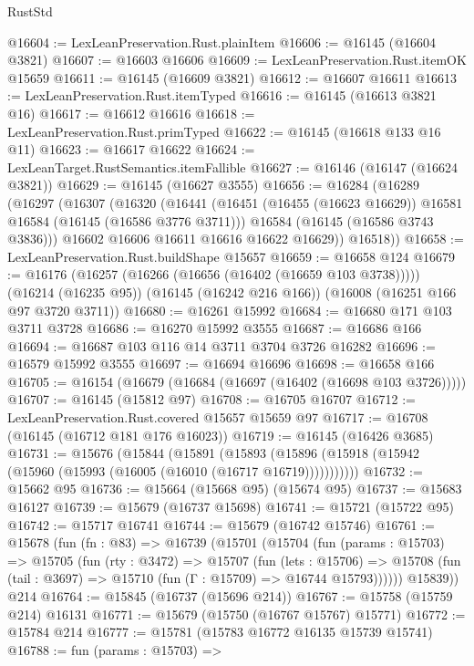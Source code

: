 \begin{lexlean}{RustStd}
\begin{coremodule}
@16604 := LexLeanPreservation.Rust.plainItem
@16606 := @16145 (@16604 @3821)
@16607 := @16603 @16606
@16609 := LexLeanPreservation.Rust.itemOK @15659
@16611 := @16145 (@16609 @3821)
@16612 := @16607 @16611
@16613 := LexLeanPreservation.Rust.itemTyped
@16616 := @16145 (@16613 @3821 @16)
@16617 := @16612 @16616
@16618 := LexLeanPreservation.Rust.primTyped
@16622 := @16145 (@16618 @133 @16 @11)
@16623 := @16617 @16622
@16624 := LexLeanTarget.RustSemantics.itemFallible
@16627 := @16146 (@16147 (@16624 @3821))
@16629 := @16145 (@16627 @3555)
@16656 := @16284
    (@16289
      (@16297
        (@16307
          (@16320
            (@16441
              (@16451 (@16455 (@16623 @16629)) @16581 @16584 (@16145 (@16586 @3776 @3711)))
              @16584
              (@16145 (@16586 @3743 @3836)))
            @16602
            @16606
            @16611
            @16616
            @16622
            @16629))
        @16518))
@16658 := LexLeanPreservation.Rust.buildShape @15657
@16659 := @16658 @124
@16679 := @16176
    (@16257 (@16266 (@16656 (@16402 (@16659 @103 @3738)))))
    (@16214 (@16235 @95))
    (@16145 (@16242 @216 @166))
    (@16008 (@16251 @166 @97 @3720 @3711))
@16680 := @16261 @15992
@16684 := @16680 @171 @103 @3711 @3728
@16686 := @16270 @15992 @3555
@16687 := @16686 @166
@16694 := @16687 @103 @116 @14 @3711 @3704 @3726 @16282
@16696 := @16579 @15992 @3555
@16697 := @16694 @16696
@16698 := @16658 @166
@16705 := @16154 (@16679 (@16684 (@16697 (@16402 (@16698 @103 @3726)))))
@16707 := @16145 (@15812 @97)
@16708 := @16705 @16707
@16712 := LexLeanPreservation.Rust.covered @15657 @15659 @97
@16717 := @16708 (@16145 (@16712 @181 @176 @16023))
@16719 := @16145 (@16426 @3685)
@16731 := @15676
    (@15844
      (@15891
        (@15893 (@15896 (@15918 (@15942 (@15960 (@15993 (@16005 (@16010 (@16717 @16719)))))))))))
@16732 := @15662 @95
@16736 := @15664 (@15668 @95) (@15674 @95)
@16737 := @15683 @16127
@16739 := @15679 (@16737 @15698)
@16741 := @15721 (@15722 @95)
@16742 := @15717 @16741
@16744 := @15679 (@16742 @15746)
@16761 := @15678
    (fun (fn : @83) =>
    @16739
      (@15701
        (@15704
          (fun (params : @15703) =>
          @15705
            (fun (rty : @3472) =>
            @15707
              (fun (lets : @15706) =>
              @15708 (fun (tail : @3697) => @15710 (fun (Γ : @15709) => @16744 @15793))))))
        @15839))
    @214
@16764 := @15845 (@16737 (@15696 @214))
@16767 := @15758 (@15759 @214) @16131
@16771 := @15679 (@15750 (@16767 @15767) @15771)
@16772 := @15784 @214
@16777 := @15781 (@15783 @16772 @16135 @15739 @15741)
@16788 := fun (params : @15703) =>

\end{coremodule}
\end{lexlean}
